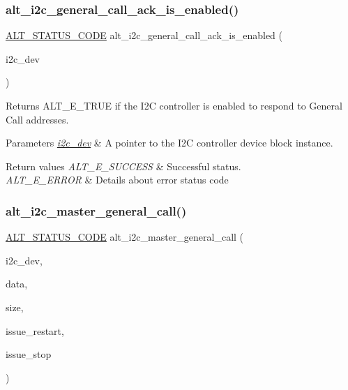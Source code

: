 \subsubsection{\texorpdfstring{alt\_i2c\_general\_call\_ack\_is\_enabled()}{alt\_i2c\_general\_call\_ack\_is\_enabled()}}
{\footnotesize\ttfamily \mbox{\hyperlink{hwlib_8h_abdb0d369f069723ca55d6c94bcaaaa12}{A\+L\+T\+\_\+\+S\+T\+A\+T\+U\+S\+\_\+\+C\+O\+DE}} alt\+\_\+i2c\+\_\+general\+\_\+call\+\_\+ack\+\_\+is\+\_\+enabled (\begin{DoxyParamCaption}\item[{\mbox{\hyperlink{structALT__I2C__DEV__s}{A\+L\+T\+\_\+\+I2\+C\+\_\+\+D\+E\+V\+\_\+t}} $\ast$}]{i2c\+\_\+dev }\end{DoxyParamCaption})}

Returns A\+L\+T\+\_\+\+E\+\_\+\+T\+R\+UE if the I2C controller is enabled to respond to General Call addresses.


\begin{DoxyParams}{Parameters}
{\em \mbox{\hyperlink{structi2c__dev}{i2c\+\_\+dev}}} & A pointer to the I2C controller device block instance.\\
\hline
\end{DoxyParams}

\begin{DoxyRetVals}{Return values}
{\em A\+L\+T\+\_\+\+E\+\_\+\+S\+U\+C\+C\+E\+SS} & Successful status. \\
\hline
{\em A\+L\+T\+\_\+\+E\+\_\+\+E\+R\+R\+OR} & Details about error status code \\
\hline
\end{DoxyRetVals}
\mbox{\label{group__ALT__I2C__GEN__CALL_gadf63bde5b3f565154bc4bd101176f1b2}} 
\subsubsection{\texorpdfstring{alt\_i2c\_master\_general\_call()}{alt\_i2c\_master\_general\_call()}}
{\footnotesize\ttfamily \mbox{\hyperlink{hwlib_8h_abdb0d369f069723ca55d6c94bcaaaa12}{A\+L\+T\+\_\+\+S\+T\+A\+T\+U\+S\+\_\+\+C\+O\+DE}} alt\+\_\+i2c\+\_\+master\+\_\+general\+\_\+call (\begin{DoxyParamCaption}\item[{\mbox{\hyperlink{structALT__I2C__DEV__s}{A\+L\+T\+\_\+\+I2\+C\+\_\+\+D\+E\+V\+\_\+t}} $\ast$}]{i2c\+\_\+dev,  }\item[{const void $\ast$}]{data,  }\item[{const size\+\_\+t}]{size,  }\item[{const bool}]{issue\+\_\+restart,  }\item[{const bool}]{issue\+\_\+stop }\end{DoxyParamCaption})}

